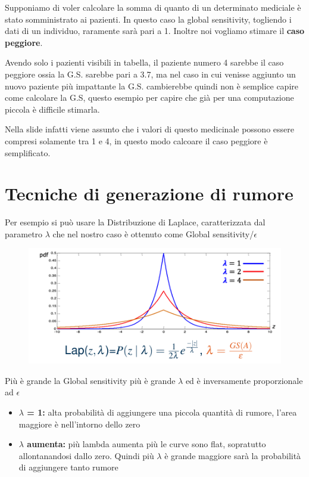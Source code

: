 \documentclass{report}
\begin{document}
\noindent Supponiamo di voler calcolare la somma di quanto di un determinato mediciale è stato somministrato ai pazienti. In questo caso la global sensitivity, togliendo i dati di un individuo, raramente sarà pari a 1. Inoltre noi vogliamo stimare il \textbf{caso peggiore}.

\noindent Avendo solo i pazienti visibili in tabella, il paziente numero 4 sarebbe il caso peggiore ossia la G.S. sarebbe pari a 3.7, ma nel caso in cui venisse aggiunto un nuovo paziente
più impattante la G.S. cambierebbe quindi non è semplice capire come calcolare la G.S, questo esempio per capire che già per una computazione piccola è difficile stimarla.

\noindent Nella slide infatti viene assunto che i valori di questo medicinale possono essere compresi solamente tra 1 e 4, in questo modo calcoare il caso peggiore è semplificato.

\section{Tecniche di generazione di rumore}
Per esempio si può usare la Distribuzione di Laplace, caratterizzata dal parametro $\lambda$ che nel nostro caso 
è ottenuto come Global sensitivity/$\epsilon$

\begin{figure}[H]
        \centering
        \includegraphics[width=0.4\linewidth]{images/Laplace.png}
    \end{figure}
\noindent Più è grande la Global sensitivity più è grande $\lambda$ ed è inversamente proporzionale ad $\epsilon$ 
\begin{itemize}
    \item \textbf{$\lambda$ = 1:} alta probabilità di aggiungere una piccola quantità di rumore, l'area maggiore è nell'intorno dello zero
    \item \textbf{$\lambda$ aumenta:} più lambda aumenta più le curve sono flat, sopratutto allontanandosi dallo zero. Quindi più $\lambda$ è grande maggiore sarà la probabilità di aggiungere tanto rumore 
\end{itemize}
\end{document}
